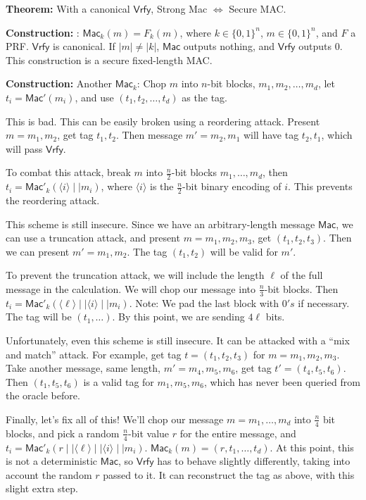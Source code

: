 \documentclass[10pt]{article}
\newcommand{\thm}[1]{{\bf Theorem:} \underline{#1}}
\newcommand{\con}[1]{{\bf Construction:} \underline{#1}}
\newcommand{\Mac}{\mathsf{Mac}}
\newcommand{\Vrfy}{\mathsf{Vrfy}}
\newcommand{\ang}[1]{\langle#1\rangle}
\begin{document}
\begin{multicols}{5}
\thm{} With a canonical $\Vrfy$, Strong Mac $\Leftrightarrow$ Secure MAC.

\con{}: $\Mac_k(m)=F_k(m)$, where $k\in\{0,1\}^n$, $m\in\{0,1\}^n$, and $F$ a PRF. $\Vrfy$ is canonical. If $|m|\neq|k|$, $\Mac$ outputs nothing, and $\Vrfy$ outputs $0$. This construction is a secure fixed-length MAC.

\con{} Another $\Mac_k$: Chop $m$ into $n$-bit blocks, $m_1,m_2,\dots,m_d$, let $t_i=\Mac'(m_i)$, and use $(t_1,t_2,\dots,t_d)$ as the tag.

This is bad. This can be easily broken using a reordering attack. Present $m=m_1,m_2$, get tag $t_1,t_2$. Then message $m'=m_2,m_1$ will have tag $t_2,t_1$, which will pass $\Vrfy$.

To combat this attack, break $m$ into $\frac{n}{2}$-bit blocks $m_1,\dots,m_d$, then $t_i=\Mac'_k(\ang{i}\mid\mid m_i)$, where $\ang{i}$ is the $\frac{n}{2}$-bit binary encoding of $i$. This prevents the reordering attack.

This scheme is still insecure. Since we have an arbitrary-length message $\Mac$, we can use a truncation attack, and present $m=m_1,m_2,m_3$, get $(t_1,t_2,t_3)$. Then we can present $m'=m_1,m_2$. The tag $(t_1,t_2)$ will be valid for $m'$.

To prevent the truncation attack, we will include the length $\ell$ of the full message in the calculation. We will chop our message into $\frac{n}{3}$-bit blocks. Then $t_i=\Mac'_k(\ang{\ell}\mid\mid\ang{i}\mid\mid m_i)$. Note: We pad the last block with $0's$ if necessary. The tag will be $(t_1,\dots)$. By this point, we are sending $4\ell$ bits.

Unfortunately, even this scheme is still insecure. It can be attacked with a ``mix and match'' attack. For example, get tag $t=(t_1,t_2,t_3)$ for $m=m_1,m_2,m_3$. Take another message, same length, $m'=m_4,m_5,m_6$, get tag $t'=(t_4,t_5,t_6)$. Then $(t_1,t_5,t_6)$ is a valid tag for $m_1,m_5,m_6$, which has never been queried from the oracle before.

Finally, let's fix all of this! We'll chop our message $m=m_1,\dots,m_d$ into $\frac{n}{4}$ bit blocks, and pick a random $\frac{n}{4}$-bit value $r$ for the entire message, and $t_i=\Mac'_k(r\mid\mid\ang{\ell}\mid\mid\ang{i}\mid\mid m_i)$. $\Mac_k(m)=(r,t_1,\dots,t_d)$. At this point, this is not a deterministic $\Mac$, so $\Vrfy$ has to behave slightly differently, taking into account the random $r$ passed to it. It can reconstruct the tag as above, with this slight extra step.


\end{multicols}
\end{document}
